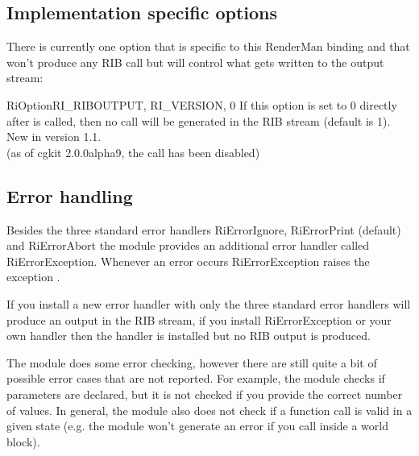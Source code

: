 \subsection{Implementation specific options}

There is currently one option that is specific to this RenderMan
binding and that won't produce any RIB call but will control what gets
written to the output stream:

\begin{funcdesc}{RiOption}{RI_RIBOUTPUT, RI_VERSION, 0}
If this option is set to 0 directly after  is
called, then no  call will be generated in the RIB stream
(default is 1).\\
New in version 1.1.\\
(as of cgkit 2.0.0alpha9, the  call has been disabled)
\end{funcdesc}

\subsection{Error handling}

Besides the three standard error handlers RiErrorIgnore, RiErrorPrint
(default) and RiErrorAbort the module provides an additional error
handler called RiErrorException. Whenever an error occurs
RiErrorException raises the exception .

If you install a new error handler with 
only the three standard error handlers will produce an output in the
RIB stream, if you install RiErrorException or your own handler then
the handler is installed but no RIB output is produced.

The module does some error checking, however there are still quite a
bit of possible error cases that are not reported. For example, the
module checks if parameters are declared, but it is not checked if you
provide the correct number of values. In general, the module also does
not check if a function call is valid in a given state (e.g. the
module won't generate an error if you call 
inside a world block).


